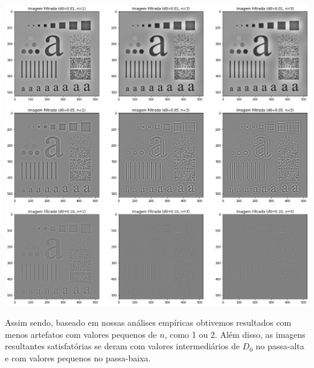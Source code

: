 \documentclass[12pt,a4paper]{article}
\begin{document}
\vspace{1em}
\begin{center}
	\includegraphics[width=\textwidth]{imagens_high_pass}
\end{center}
\vspace{1em}


Assim sendo, baseado em nossas análises empíricas obtivemos resultados com menos artefatos com valores pequenos de $n$, como 1 ou 2. Além disso, as imagens resultantes satisfatórias se deram com valores intermediários de $D_0$ no passa-alta e com valores pequenos no passa-baixa.

\newpage

\nocite{comin2020}
\nocite{wiki01}



\end{document}
